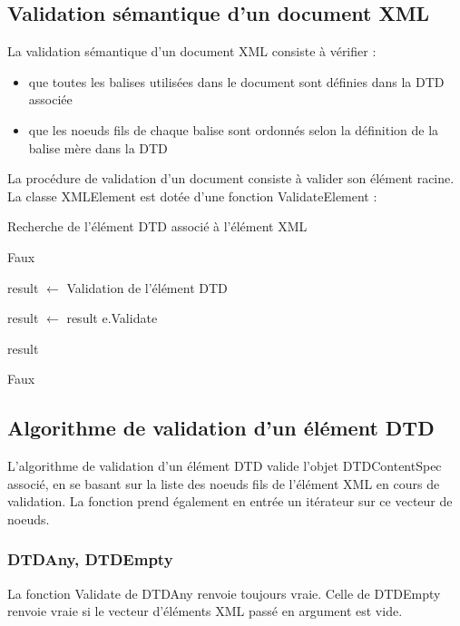 \subsection{Validation sémantique d'un document XML}

La validation sémantique d'un document XML consiste à vérifier : 

\begin{itemize}
\item que toutes les balises utilisées dans le document sont définies dans
la DTD associée
\item que les noeuds fils de chaque balise sont ordonnés selon la
définition de la balise mère dans la DTD
\end{itemize}

La procédure de validation d'un document consiste à valider son élément
racine.\\
La classe XMLElement est dotée d'une fonction ValidateElement :

\begin{algorithmic}
\STATE Recherche de l'élément DTD associé à l'élément XML

\RETURN Faux
\ENDIF

\STATE result $\gets$ Validation de l'élément DTD


\STATE result $\gets$ result \AND e.Validate
\ENDFOR

\RETURN result

\ELSE
\RETURN Faux
\ENDIF
\end{algorithmic}


\subsection{Algorithme de validation d'un élément DTD}

L'algorithme de validation d'un élément DTD valide l'objet DTDContentSpec
associé, en se basant sur la liste des noeuds fils de l'élément XML en
cours de validation. La fonction prend également en entrée un itérateur sur
ce vecteur de noeuds.

\subsubsection{DTDAny, DTDEmpty}

La fonction Validate de DTDAny renvoie toujours vraie. Celle de DTDEmpty
renvoie vraie si le vecteur d'éléments XML passé en argument est vide.

